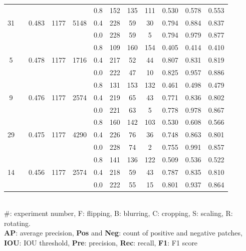 \documentclass[authoryear,preprint,review,12pt]{elsarticle}
\begin{document}
\begin{table}
\begin{tabular}{c >{\centering\arraybackslash}m{2.2cm} c c  c ccc c c c c}
\multirow{3}{*}{31} &  \multirow{3}{*}{F, B, C, S, R} & \multirow{3}{*}{0.483} & \multirow{3}{*}{1177} & \multirow{3}{*}{5148} &0.8 & 152 & 135 & 111 & 0.530 & 0.578 & 0.553\\[-1ex]
 &  & &  &   & 0.4 & 228 & 59 & 30 & 0.794 & 0.884 & 0.837\\[-1ex]
 &  & &  &   & 0.0 & 228 & 59 & 5 & 0.794 & 0.979 & 0.877\\[-1ex]
\midrule
\multirow{3}{*}{5} &  \multirow{3}{*}{R} & \multirow{3}{*}{0.478} & \multirow{3}{*}{1177} & \multirow{3}{*}{1716} &0.8 & 109 & 160 & 154 & 0.405 & 0.414 & 0.410\\[-1ex]
 &  & &  &   & 0.4 & 217 & 52 & 44 & 0.807 & 0.831 & 0.819\\[-1ex]
 &  & &  &   & 0.0 & 222 & 47 & 10 & 0.825 & 0.957 & 0.886\\[-1ex]
\midrule
\multirow{3}{*}{9} &  \multirow{3}{*}{F, R} & \multirow{3}{*}{0.476} & \multirow{3}{*}{1177} & \multirow{3}{*}{2574} &0.8 & 131 & 153 & 132 & 0.461 & 0.498 & 0.479\\[-1ex]
 &  & &  &   & 0.4 & 219 & 65 & 43 & 0.771 & 0.836 & 0.802\\[-1ex]
 &  & &  &   & 0.0 & 221 & 63 & 5 & 0.778 & 0.978 & 0.867\\[-1ex]
\midrule
\multirow{3}{*}{29} &  \multirow{3}{*}{F, C, S, R} & \multirow{3}{*}{0.475} & \multirow{3}{*}{1177} & \multirow{3}{*}{4290} &0.8 & 160 & 142 & 103 & 0.530 & 0.608 & 0.566\\[-1ex]
 &  & &  &   & 0.4 & 226 & 76 & 36 & 0.748 & 0.863 & 0.801\\[-1ex]
 &  & &  &   & 0.0 & 228 & 74 & 2 & 0.755 & 0.991 & 0.857\\[-1ex]
\midrule
\multirow{3}{*}{14} &  \multirow{3}{*}{C, R} & \multirow{3}{*}{0.456} & \multirow{3}{*}{1177} & \multirow{3}{*}{2574} &0.8 & 141 & 136 & 122 & 0.509 & 0.536 & 0.522\\[-1ex]
 &  & &  &   & 0.4 & 218 & 59 & 43 & 0.787 & 0.835 & 0.810\\[-1ex]
 &  & &  &   & 0.0 & 222 & 55 & 15 & 0.801 & 0.937 & 0.864\\[-1ex]

 
\bottomrule
\end{tabular}
\raggedright \\ \#: experiment number, F: flipping, B: blurring, C: cropping, S: scaling, R: rotating.  \\\textbf{AP}: average precision, \textbf{Pos} and \textbf{Neg}: count of positive and negative patches, \textbf{IOU}: IOU threshold, \textbf{Pre}: precision, \textbf{Rec}: recall, \textbf{F1}: F1 score

\end{table}
\end{document}
